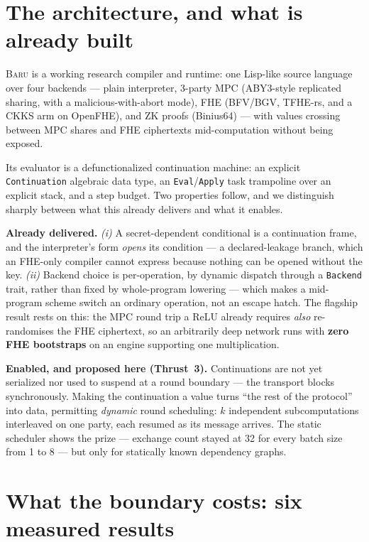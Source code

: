 \documentclass[10pt]{article}
\newcommand{\baru}{\textsc{Baru}}
\begin{document}
\section{The architecture, and what is already built}

\baru{} is a working research compiler and runtime: one Lisp-like source
language over four backends --- plain interpreter, 3-party MPC (ABY3-style
replicated sharing, with a malicious-with-abort mode), FHE (BFV/BGV, TFHE-rs,
and a CKKS arm on OpenFHE), and ZK proofs (Binius64) --- with values crossing
between MPC shares and FHE ciphertexts mid-computation without being exposed.

Its evaluator is a defunctionalized continuation machine: an explicit
\texttt{Continuation} algebraic data type, an \texttt{Eval}/\texttt{Apply} task
trampoline over an explicit stack, and a step budget. Two properties follow, and
we distinguish sharply between what this already delivers and what it enables.

\noindent\textbf{Already delivered.} \emph{(i)} A secret-dependent conditional
is a continuation frame, and the interpreter's form \emph{opens} its condition
--- a declared-leakage branch, which an FHE-only compiler cannot express because
nothing can be opened without the key. \emph{(ii)}
Backend choice is per-operation, by dynamic dispatch through a \texttt{Backend}
trait, rather than fixed by whole-program lowering --- which makes a mid-program
scheme switch an ordinary operation, not an escape hatch. The flagship result
rests on this: the MPC round trip a ReLU already requires \emph{also}
re-randomises the FHE ciphertext, so an arbitrarily deep network runs with
\textbf{zero FHE bootstraps} on an engine supporting one multiplication.

\noindent\textbf{Enabled, and proposed here (Thrust~3).} Continuations are not
yet serialized nor used to suspend at a round boundary --- the transport blocks
synchronously. Making the continuation a value turns ``the rest of the
protocol'' into data, permitting \emph{dynamic} round scheduling: $k$
independent subcomputations interleaved on one party, each resumed as its
message arrives. The static scheduler shows the prize --- exchange count stayed
at 32 for every batch size from 1 to 8 --- but only for statically known
dependency graphs.

\section{What the boundary costs: six measured results}
\end{document}
